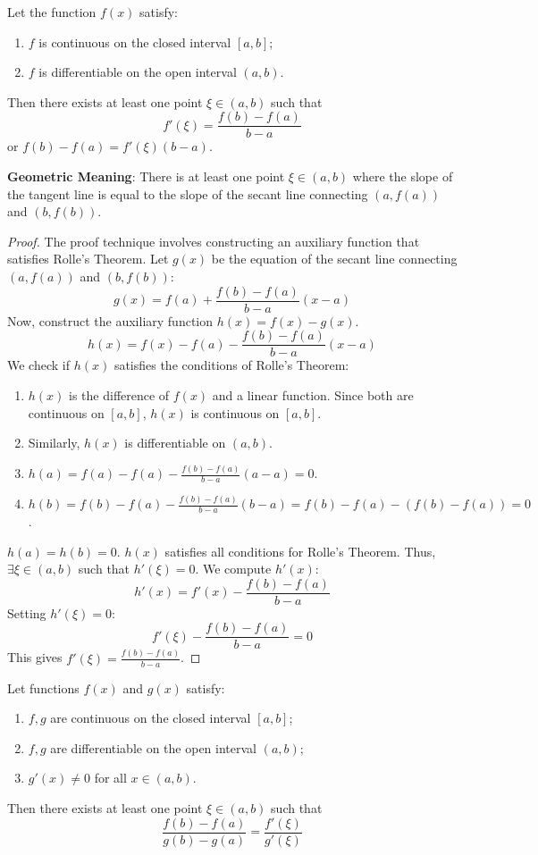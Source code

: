 \begin{theorem}
\label{thm:lagrange_en}
Let the function $f(x)$ satisfy:
\begin{enumerate}
    \item $f$ is continuous on the closed interval $[a, b]$;
    \item $f$ is differentiable on the open interval $(a, b)$.
\end{enumerate}
Then there exists at least one point $\xi \in (a, b)$ such that
\[
f'(\xi) = \frac{f(b) - f(a)}{b - a}
\]
or $f(b) - f(a) = f'(\xi)(b - a)$.
\end{theorem}

\textbf{Geometric Meaning}: There is at least one point $\xi \in (a, b)$ where the slope of the tangent line is equal to the slope of the secant line connecting $(a, f(a))$ and $(b, f(b))$.

\begin{proof}
The proof technique involves constructing an auxiliary function that satisfies Rolle's Theorem.
Let $g(x)$ be the equation of the secant line connecting $(a, f(a))$ and $(b, f(b))$:
\[
g(x) = f(a) + \frac{f(b) - f(a)}{b - a} (x - a)
\]
Now, construct the auxiliary function $h(x) = f(x) - g(x)$.
\[
h(x) = f(x) - f(a) - \frac{f(b) - f(a)}{b - a} (x - a)
\]
We check if $h(x)$ satisfies the conditions of Rolle's Theorem:
\begin{enumerate}
    \item $h(x)$ is the difference of $f(x)$ and a linear function. Since both are continuous on $[a, b]$, $h(x)$ is continuous on $[a, b]$.
    \item Similarly, $h(x)$ is differentiable on $(a, b)$.
    \item $h(a) = f(a) - f(a) - \frac{f(b) - f(a)}{b - a} (a - a) = 0$.
    \item $h(b) = f(b) - f(a) - \frac{f(b) - f(a)}{b - a} (b - a) = f(b) - f(a) - (f(b) - f(a)) = 0$.
\end{enumerate}
$h(a) = h(b) = 0$.
$h(x)$ satisfies all conditions for Rolle's Theorem. Thus, $\exists \xi \in (a, b)$ such that $h'(\xi) = 0$.
We compute $h'(x)$:
\[
h'(x) = f'(x) - \frac{f(b) - f(a)}{b - a}
\]
Setting $h'(\xi) = 0$:
\[
f'(\xi) - \frac{f(b) - f(a)}{b - a} = 0
\]
This gives $f'(\xi) = \frac{f(b) - f(a)}{b - a}$.
\end{proof}

\begin{theorem}
\label{thm:cauchy_mvt_en}
Let functions $f(x)$ and $g(x)$ satisfy:
\begin{enumerate}
    \item $f, g$ are continuous on the closed interval $[a, b]$;
    \item $f, g$ are differentiable on the open interval $(a, b)$;
    \item $g'(x) \neq 0$ for all $x \in (a, b)$.
\end{enumerate}
Then there exists at least one point $\xi \in (a, b)$ such that
\[
\frac{f(b) - f(a)}{g(b) - g(a)} = \frac{f'(\xi)}{g'(\xi)}
\]
\end{theorem}

